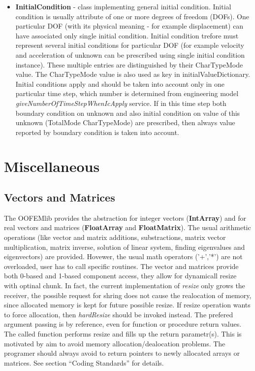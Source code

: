 \documentclass[a4paper]{article}
\newcommand{\class}[1]{{\bf #1}}
\newcommand{\service}[1]{{\em #1}}
\newcommand{\attribute}[1]{#1}
\begin{document}
\begin{itemize}
\item
\class{InitialCondition} - class implementing general initial condition. Initial condition is usually attribute of
one or more degrees of freedom (DOFs). One particular DOF (with its
physical meaning - for example displacement) can have associated only
single initial condition.	Initial condition trefore must represent
several initial conditions for particular DOF (for example velocity
and acceleration of unknown can be prescribed using single initial
condition instance). These multiple entries are distinguished by their
CharTypeMode value.	The CharTypeMode value is also used as key in
\attribute{initialValueDictionary}.
Initial conditions apply and should be taken into account	only in one
particular time step, which number is determined from engineering
model	\service{giveNumberOfTimeStepWhenIcApply} service. If in this
time step both boundary condition on unknown and also initial
condition on value of this unknown (TotalMode CharTypeMode) are
prescribed, then always value reported by boundary condition is taken
into account.
\end{itemize}

\section{Miscellaneous}
\subsection{Vectors and Matrices}
The OOFEMlib provides the abstraction for integer vectors (\class{IntArray})
and for real vectors and matrices (\class{FloatArray} and
\class{FloatMatrix}). The usual arithmetic operations (like vector and
matrix additions, substractions, matrix vector multiplication, matrix
inverse, solution of linear system, finding eigenvalues and
eigenvectors) are provided. Hovewer, the usual math operators ('+','*')
are not overloaded, user has to call specific routines. 
The vector and matrices provide both 0-based and 1-based component
access, they allow for dynamicall resize with optinal chunk. In fact,
the current implementation of \service{resize} only grows the
receiver, the possible request for shring does not cause the
realocation of memory, since allocated memory is kept for future possible resize. If
resize operation wants to force allocation, then \service{hardResize}
should be invoked instead. 
The prefered argument passing is by reference, even for function or
procedure return values.
The called function performs resize and fills up
the return parametr(s). This is motivated by aim to avoid memory
allocation/dealocation problems. The programer should always avoid to
return pointers to newly allocated arrays or matrices. 
See section ``Coding Standards'' for
details.
\end{document}
